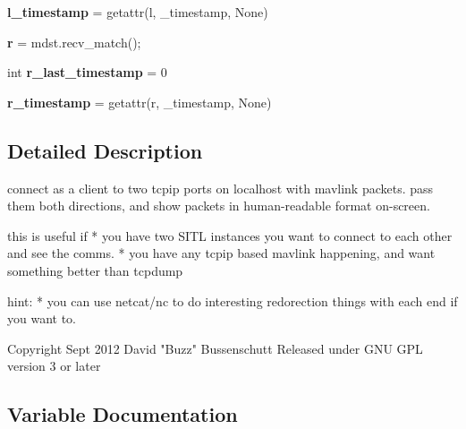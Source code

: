 \begin{DoxyCompactItemize}
{\bfseries l\+\_\+timestamp} = getattr(l, \textquotesingle{}\+\_\+timestamp\textquotesingle{}, None)
\item 
\mbox{\label{namespacepymavlink_1_1examples_1_1mavtcpsniff_ac95233adb6f5bcb5198de3ac5149983a}} 
{\bfseries r} = mdst.\+recv\+\_\+match();
\item 
\mbox{\label{namespacepymavlink_1_1examples_1_1mavtcpsniff_ae9c1681b1baa25c1396eb5504141c086}} 
int {\bfseries r\+\_\+last\+\_\+timestamp} = 0
\item 
\mbox{\label{namespacepymavlink_1_1examples_1_1mavtcpsniff_ae2380478b63eddb15d96696d8e664ba1}} 
{\bfseries r\+\_\+timestamp} = getattr(r, \textquotesingle{}\+\_\+timestamp\textquotesingle{}, None)
\end{DoxyCompactItemize}


\subsection{Detailed Description}
\begin{DoxyVerb}connect as a client to two tcpip ports on localhost with mavlink packets.    pass them both directions, and show packets in human-readable format on-screen.

this is useful if
* you have two SITL instances you want to connect to each other and see the comms.
* you have any tcpip based mavlink happening, and want something better than tcpdump

hint:
* you can use netcat/nc to do interesting redorection things with each end if you want to.

Copyright Sept 2012 David "Buzz" Bussenschutt
Released under GNU GPL version 3 or later
\end{DoxyVerb}
 

\subsection{Variable Documentation}
\mbox{\label{namespacepymavlink_1_1examples_1_1mavtcpsniff_a7574d37d3c8cf95c5f4833e889b5bc82}} 
